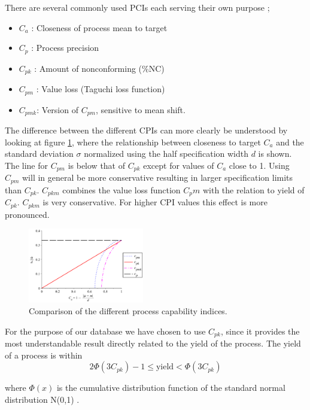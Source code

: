 \documentclass[aip,amsmath, reprint, author-year]{revtex4-1}
\begin{document}
There are several commonly used PCIs each serving their own purpose  \citep{wu2009overview, taguchi1986introduction};
\begin{itemize}
	\item $C_a$ : Closeness of process mean to target 
	\item $C_p$ : Process precision 
	\item $C_{pk}$ : Amount of nonconforming (\%NC)
	\item $C_{pm}$ : Value loss (Taguchi loss function)
	\item $C_{pmk}$: Version of $C_{pm}$,  sensitive to mean shift. 
\end{itemize}

The difference between the different CPIs can more clearly be understood by looking at figure \ref{fig:CPI}, where the relationship between closeness to target $C_a$ and the standard deviation $\sigma$ normalized using the half specification width $d$ is shown. The line for $C_{pm}$ is below that of $C_{pk}$ except for values of $C_a$ close to 1. Using $C_{pm}$ will in general be more conservative resulting in larger specification limits than $C_{pk}$. $C_{pkm}$ combines the value loss function $C_pm$ with the relation to yield of $C_{pk}$. $C_{pkm}$ is very conservative. For higher CPI values this effect is more pronounced.


\begin{figure}
\includegraphics[width=0.45\textwidth]{cpm_cpk.pdf}
\caption{\label{fig:CPI} Comparison of the different process capability indices.  }
\end{figure}

For the purpose of our database we have chosen to use $C_{pk}$, since it provides the most understandable result directly related to the yield of the process. The yield of a process is within
\begin{equation}
	2\Phi(3C_{pk})-1 \leq \text{yield} < \Phi(3C_{pk}) \nonumber
\end{equation}

where $\Phi(x)$ is the cumulative distribution function of the standard normal distribution N(0,1) \citep{boyles1991taguchi}. 
\end{document}
